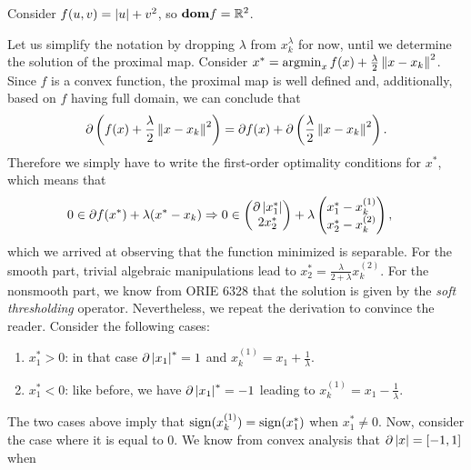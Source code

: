 \documentclass[10pt]{article}
\begin{document}
\allowdisplaybreaks
\everymath{\displaystyle}


\begin{Exercise}
	\label{ex:p1}
	Consider $f(u, v) = \left| u \right| + v^2$, so $\textbf{dom} f = \mathbb{R}^2$.

	\ExePart

		Let us simplify the notation by dropping $\lambda$ from $x_k^{\lambda}$
		for now, until we determine the solution of the proximal map.
		Consider $x^* = \operatorname*{argmin}_{x} f(x) + \frac{\lambda}{2} \left \| x - x_k \right \|^2$.
		Since $f$ is a convex function, the proximal map is well defined and,
		additionally, based on $f$ having full domain, we can conclude that
		\[
			\partial \left(f(x) + \frac{\lambda}{2} \left \| x - x_k \right \|^2 \right)
			= \partial f(x) + \partial \left( \frac{\lambda}{2} \left \| x -
			x_k \right \|^2 \right).
		\]
		Therefore we simply have to write the first-order optimality conditions
		for $x^*$, which means that
		\begin{align*}
			0 &\in \partial f(x^*) + \lambda ( x^* - x_k ) \Rightarrow
			0 \in \begin{pmatrix} \partial \left| x^*_1 \right| \\ 2 x^*_2 \end{pmatrix}
				+ \lambda \begin{pmatrix} x^*_1 - x_k^{(1)} \\ x^*_2 - x_k^{(2)}
				\end{pmatrix},
		\end{align*}
		which we arrived at observing that the function minimized is separable.
		For the smooth part, trivial algebraic manipulations lead to $x_2^* =
		\frac{\lambda}{2 + \lambda} x_k^{(2)}$. For the nonsmooth part, we
		know from ORIE 6328 that the solution is given by the
		\textit{soft thresholding} operator. Nevertheless, we repeat the
		derivation to convince the reader. Consider the following cases:
		\begin{enumerate}
			\item $x^*_1 > 0$: in that case $\partial \left| x_1 \right|^* = 1$ and
				$x_k^{(1)} = x_1 + \frac{1}{\lambda}$.
			\item $x^*_1 < 0$: like before, we have $\partial \left| x_1 \right|^* = -1$
				leading to $x_k^{(1)} = x_1 - \frac{1}{\lambda}$.
		\end{enumerate}
		The two cases above imply that $\mathrm{sign}(x_k^{(1)}) = \mathrm{sign}(x_1^*)$ when
		$x_1^* \neq 0$. Now, consider the case where it is equal to $0$. We
		know from convex analysis that $\partial \left| x \right| = [-1, 1]$ when

\end{Exercise}
\end{document}
